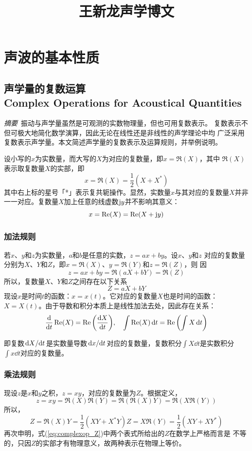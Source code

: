 \documentclass[UTF8]{ctexbook}
\title{王新龙声学博文}
\let\stdsection\section
\renewcommand\section{\newpage\stdsection}
\begin{document}
\maketitle

\tableofcontents

\chapter{声波的基本性质}

\section{声学量的复数运算\\
Complex Operations for Acoustical Quantities}

\emph{摘要}\ 振动与声学量虽然是可观测的实数物理量，但也可用复数表示。
复数表示不但可极大地简化数学演算，因此无论在线性还是非线性的声学理论中均
广泛采用复数表示声学量。本文简述声学量的复数表示及运算规则，并举例说明。

设小写的$x$为实数量，而大写的$X$为对应的复数量，即$x=\Re(X)$，其中
$\Re(X)$表示取复数量$X$的实部，即
$$
x = \Re(X) = \frac12(X+X^*)
$$
其中右上标的星号「*」表示复共轭操作。显然，实数量$x$与其对应的复数量$X$并非
一一对应。复数量$X$加上任意的线虚数$\mathrm{j} y$并不影响其意义：
$$
x = \Re(X) = \Re(X+\mathrm{j} y)
$$

\subsection{加法规则}
若$x$、$y$和$z$为实数量，$a$和$b$是任意的实数，$z=ax+by$。设$x$、$y$和$z$
对应的复数量分别为$X$、$Y$和$Z$，即$x=\Re(X)$、$y=\Re(Y)$和$z=\Re(Z)$，则
因
$$
z = ax+by = \Re(aX+bY) = \Re(Z)
$$
所以，复数量$X$、$Y$和$Z$之间存在以下关系
$$Z=aX+bY$$
现设$x$是时间$t$的函数：$x=x(t)$。它对应的复数量$X$也是时间的函数：$X=
X(t)$。由于导数和积分本质上是线性加法去处，因此存在关系：
$$\dv{t} \Re(X) =\Re\qty(\dv{X}{t})\qc \int \Re(X) \dd{t} = \Re 
\qty(\int X\dd{t})$$

即复数$\dv*{X}{t}$是实数量导数$\dv*{x}{t}$对应的复数量，复数积分$\int X
\dd{t}$是实数积分$\int x\dd{t}$对应的复数量。

\subsection{乘法规则}
现设$z$是$x$和$y$之积，$z=xy$，对应的复数量为$Z$。根据定义，
$$z=xy =\Re(X)\Re(Y) = \Re(\Re(X)Y)=\Re(X\Re(Y))$$
所以，
\begin{subequations}
	\label{eq:complexop_Z}
	\begin{equation}Z= \Re(X)Y = \frac12 (XY+X^*Y)\end{equation}
	\begin{equation}Z=X\Re(Y) = \frac12 (XY+XY^*)\end{equation}
\end{subequations}
再次申明，式(\ref{eq:complexop_Z})中两个表式所给出的$Z$在数学上严格而言是
不等的，只因$Z$的实部才有物理意义，故两种表示在物理上等价。
\end{document}
